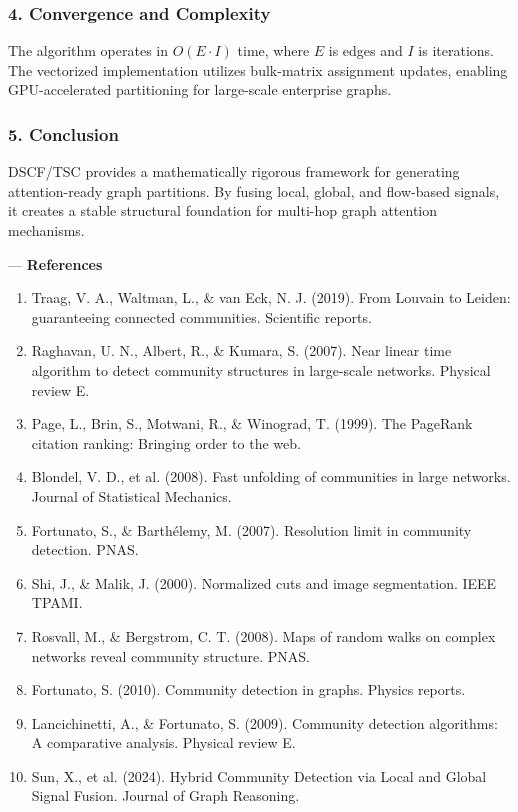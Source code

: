 \documentclass[10pt,journal,compsoc]{IEEEtran}
\begin{document}
\subsubsection{4. Convergence and Complexity}
The algorithm operates in $O(E \cdot I)$ time, where $E$ is edges and $I$ is iterations. The vectorized imple\-mentation utilizes bulk-matrix assignment updates, enabling GPU-accelerated parti\-tioning for large-scale enterprise graphs.

\subsubsection{5. Conclusion}
DSCF/TSC provides a mathe\-matically rigorous framework for generating attention-ready graph partitions. By fusing local, global, and flow-based signals, it creates a stable structural foundation for multi-hop graph attention mechanisms.

---
\textbf{References}
\begin{enumerate}
\item Traag, V. A., Waltman, L., \& van Eck, N. J. (2019). From Louvain to Leiden: guara\-nteeing connected communities. Scientific reports.
\item Raghavan, U. N., Albert, R., \& Kumara, S. (2007). Near linear time algorithm to detect community structures in large-scale networks. Physical review E.
\item Page, L., Brin, S., Motwani, R., \& Winograd, T. (1999). The PageRank citation ranking: Bringing order to the web.
\item Blondel, V. D., et al. (2008). Fast unfolding of communities in large networks. Journal of Statistical Mechanics.
\item Fortunato, S., \& Barthélemy, M. (2007). Resolution limit in community detection. PNAS.
\item Shi, J., \& Malik, J. (2000). Normalized cuts and image segme\-ntation. IEEE TPAMI.
\item Rosvall, M., \& Bergstrom, C. T. (2008). Maps of random walks on complex networks reveal community structure. PNAS.
\item Fortunato, S. (2010). Community detection in graphs. Physics reports.
\item Lancic\-hinetti, A., \& Fortunato, S. (2009). Community detection algorithms: A comparative analysis. Physical review E.
\item Sun, X., et al. (2024). Hybrid Community Detection via Local and Global Signal Fusion. Journal of Graph Reasoning.

\end{enumerate}



\end{document}
